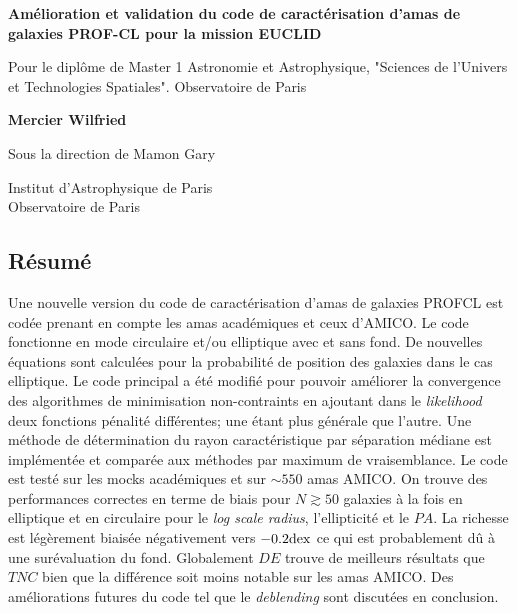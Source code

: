 \documentclass[a4paper,11pt]{article}
\numberwithin{equation}{section}
\begin{document}
\makeatletter
\begin{titlepage}
    \begin{center}
        \vspace*{1cm}
      
          {\Large \textbf{Amélioration et validation du code de caractérisation d'amas de galaxies PROF-CL pour la mission EUCLID}}
        
        \vspace{0.5cm}
        {\large Pour le diplôme de Master 1 Astronomie et Astrophysique, "Sciences de l’Univers et Technologies Spatiales". Observatoire de Paris}
        
        \vspace{1.5cm}
        
        \textbf{Mercier Wilfried}
        

        Sous la direction de Mamon Gary
        
        \vspace{0.5cm}
        \@date
        
        \vfill
      
        
        
        Institut d'Astrophysique de Paris\\
        Observatoire de Paris\\
        
    \end{center}
\end{titlepage}
\makeatother

\newpage

\begin{center}
  \section*{Résumé}
\end{center}

    Une nouvelle version du code de caractérisation d'amas de galaxies PROFCL est codée prenant en compte les amas académiques et ceux d'AMICO. Le code fonctionne en mode circulaire et/ou elliptique avec et sans fond. De nouvelles équations sont calculées pour la probabilité de position des galaxies dans le cas elliptique. Le code principal a été modifié pour pouvoir améliorer la convergence des algorithmes de minimisation non-contraints en ajoutant dans le \textit{likelihood} deux fonctions pénalité différentes; une étant plus générale que l'autre. Une méthode de détermination du rayon caractéristique par séparation médiane est implémentée et comparée aux méthodes par maximum de vraisemblance. Le code est testé sur les mocks académiques et sur $\sim 550$ amas AMICO. On trouve des performances correctes en terme de biais pour $N \gtrsim 50$ galaxies à la fois en elliptique et en circulaire pour le \textit{log scale radius}, l'ellipticité et le $PA$. La richesse est légèrement biaisée négativement vers $-0.2 \rm{dex}$ ce qui est probablement dû à une surévaluation du fond. Globalement $DE$ trouve de meilleurs résultats que $TNC$ bien que la différence soit moins notable sur les amas AMICO. Des améliorations futures du code tel que le \textit{deblending} sont discutées en conclusion.
\end{document}
